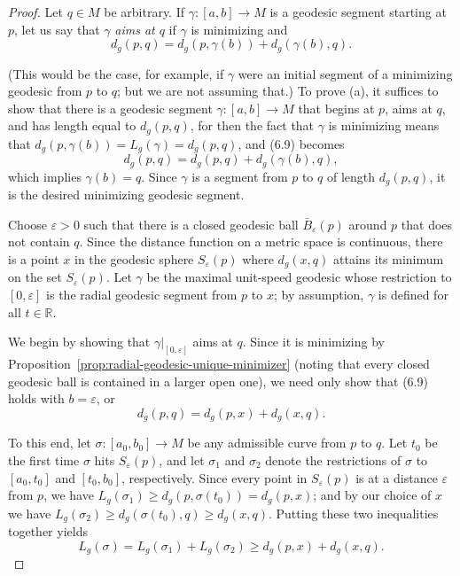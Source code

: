 \begin{proof}
Let $q \in M$ be arbitrary. If $\gamma: [a,b] \to M$ is a geodesic segment starting at $p$, let us say that $\gamma$ \emph{aims at $q$} if $\gamma$ is minimizing and
\begin{equation}
d_g(p,q) = d_g(p,\gamma(b)) + d_g(\gamma(b),q). \tag{6.9}
\end{equation}

(This would be the case, for example, if $\gamma$ were an initial segment of a minimizing geodesic from $p$ to $q$; but we are not assuming that.) To prove (a), it suffices to show that there is a geodesic segment $\gamma: [a,b] \to M$ that begins at $p$, aims at $q$, and has length equal to $d_g(p,q)$, for then the fact that $\gamma$ is minimizing means that $d_g(p,\gamma(b)) = L_g(\gamma) = d_g(p,q)$, and (6.9) becomes
\[
d_g(p,q) = d_g(p,q) + d_g(\gamma(b),q),
\]
which implies $\gamma(b) = q$. Since $\gamma$ is a segment from $p$ to $q$ of length $d_g(p,q)$, it is the desired minimizing geodesic segment.

Choose $\varepsilon > 0$ such that there is a closed geodesic ball $\bar{B}_\varepsilon(p)$ around $p$ that does not contain $q$. Since the distance function on a metric space is continuous, there is a point $x$ in the geodesic sphere $S_\varepsilon(p)$ where $d_g(x,q)$ attains its minimum on the set $S_\varepsilon(p)$. Let $\gamma$ be the maximal unit-speed geodesic whose restriction to $[0,\varepsilon]$ is the radial geodesic segment from $p$ to $x$; by assumption, $\gamma$ is defined for all $t \in \mathbb{R}$.

We begin by showing that $\gamma|_{[0,\varepsilon]}$ aims at $q$. Since it is minimizing by Proposition~\ref{prop:radial-geodesic-unique-minimizer} (noting that every closed geodesic ball is contained in a larger open one), we need only show that (6.9) holds with $b = \varepsilon$, or
\begin{equation}
d_g(p,q) = d_g(p,x) + d_g(x,q). \tag{6.10}
\end{equation}

To this end, let $\sigma: [a_0, b_0] \to M$ be any admissible curve from $p$ to $q$. Let $t_0$ be the first time $\sigma$ hits $S_\varepsilon(p)$, and let $\sigma_1$ and $\sigma_2$ denote the restrictions of $\sigma$ to $[a_0,t_0]$ and $[t_0, b_0]$, respectively. Since every point in $S_\varepsilon(p)$ is at a distance $\varepsilon$ from $p$, we have $L_g(\sigma_1) \geq d_g(p, \sigma(t_0)) = d_g(p, x)$; and by our choice of $x$ we have $L_g(\sigma_2) \geq d_g(\sigma(t_0), q) \geq d_g(x, q)$. Putting these two inequalities together yields
\[
L_g(\sigma) = L_g(\sigma_1) + L_g(\sigma_2) \geq d_g(p, x) + d_g(x, q).
\]


\end{proof}
